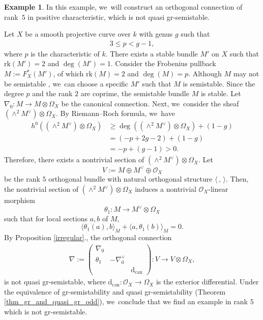 \documentclass[JEP,XML,SOM,Unicode,published]{cedram}
\newcommand{\grsemistable}{gr\nobreakdash-semi\-stable\xspace}
\newcommand{\rk}{\mathrm{rk}}
\theoremstyle{plain}
\theoremstyle{definition}
\newtheorem{examp}[thm]{Example}
\begin{document}
\begin{examp}\label{exmp_const}
In this example, we~will construct an orthogonal connection of rank~$5$ in positive characteristic, which is not quasi \grsemistable.

Let $X$ be a smooth projective curve over $k$ with genus $g$ such that
\begin{align*}
3\leq p < g-1,
\end{align*}
where $p$ is the characteristic of $k$. There exists a stable bundle $M'$ on $X$ such that $\rk(M') = 2$ and $\deg(M')=1$. Consider the Frobenius pullback $M:=F^*_X(M')$, of which $\rk(M)=2$ and $\deg(M)=p$. Although $M$ may not be semistable \cite{Gi73}, we~can choose a specific $M'$ such that $M$ is semistable. Since the degree $p$ and the rank $2$ are coprime, the semistable bundle $M$ is stable. Let $\nabla_0: M \to M \otimes \Omega_X$ be the canonical connection. Next, we~consider the sheaf $(\wedge^2 M^{\vee}) \otimes \Omega_X$. By Riemann--Roch formula, we~have
\begin{align*}
h^0((\wedge^2 M^\vee) \otimes \Omega_X) & \geq \deg( (\wedge^2 M^\vee) \otimes \Omega_X ) + (1-g) \\
& = (-p+2g-2) + (1-g) \\
& = -p + (g-1) > 0.
\end{align*}
Therefore, there exists a nontrivial section of $(\wedge^2 M^{\vee}) \otimes \Omega_X$. Let
\[
V:= M \oplus M^{\vee} \oplus \mathcal{O}_X
\]
be the rank $5$ orthogonal bundle with natural orthogonal structure $\langle \,, \, \rangle$. Then, the nontrivial section of $(\wedge^2 M^{\vee}) \otimes \Omega_X$ induces a nontrivial $\mathcal{O}_X$-linear morphism
\[
\theta_1: M \to M^{\vee} \otimes \Omega_X
\]
such that for local sections $a,b$ of $M$,
\[
\langle \theta_1(a),b \rangle_M + \langle a,\theta_1(b) \rangle_M = 0.
\]
By Proposition \ref{irregular}., the orthogonal connection
\begin{align*}
\nabla:=
\begin{pmatrix}
\nabla_0 & & \\
\theta_1 & -\nabla^\vee_0 & \\
& & \mathrm{d}_\mathrm{can}
\end{pmatrix}: V \to V \otimes \Omega_X,
\end{align*}
is not quasi \grsemistable, where $\mathrm{d}_\mathrm{can}: \mathcal{O}_X \to \Omega_X$ is the exterior differential. Under the equivalence of gr-semistability and quasi gr-semistability (Theorem \ref{thm_gr_and_quasi_gr_odd}), we~conclude that we find an example in rank $5$ which is not \grsemistable.
\end{examp}
\end{document}
